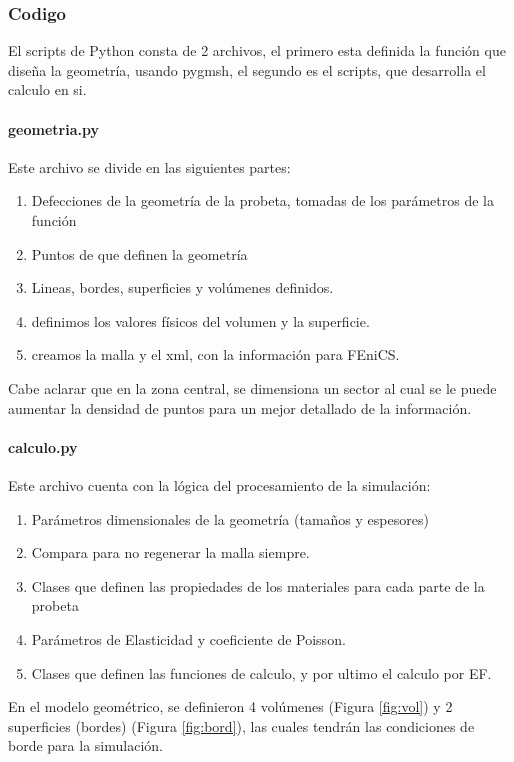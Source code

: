 \documentclass[12pt, a4paper]{article}
\begin{document}
\subsubsection{Codigo}

El scripts de Python consta de 2 archivos, el primero esta definida la función que diseña la geometría, usando pygmsh, el segundo es el scripts, que desarrolla el calculo en si.

\paragraph{geometria.py} Este archivo se divide en las siguientes partes:

\begin{enumerate}
	\item Defecciones de la geometría de la probeta, tomadas de los parámetros de la función
	\item Puntos de que definen la geometría
	\item Lineas, bordes, superficies y volúmenes definidos.
	\item definimos los valores físicos del volumen y la superficie.
	\item creamos la malla y el xml, con la información para FEniCS. 
\end{enumerate}

Cabe aclarar que en la zona central, se dimensiona un sector al cual se le puede aumentar la densidad de puntos para un mejor detallado de la información.

\paragraph{calculo.py} Este archivo cuenta con la lógica del procesamiento de la simulación:

\begin{enumerate}
	\item Parámetros dimensionales de la geometría (tamaños y espesores)
	\item Compara para no regenerar la malla siempre.
	\item Clases que definen las propiedades de los materiales para cada parte de la probeta
	\item Parámetros de Elasticidad y coeficiente de Poisson.
	\item Clases que definen las funciones de calculo, y por ultimo el calculo por EF. 
\end{enumerate}


En el modelo geométrico, se definieron 4 volúmenes (Figura \ref{fig:vol}) y 2 superficies (bordes) (Figura \ref{fig:bord}), las cuales tendrán las condiciones de borde para la simulación.
\end{document}
